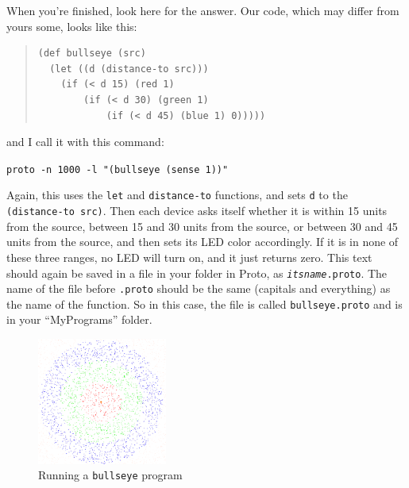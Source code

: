 \documentclass{article}
\newcommand\code[1]{\begin{center}\var{#1}\end{center}}
\newcommand\var[1]{{\tt #1}}
\begin{document}
When you're finished, look here for the answer.  Our code, which may
differ from yours some, looks like this:

\begin{quote}
\begin{verbatim}
(def bullseye (src)
  (let ((d (distance-to src)))
    (if (< d 15) (red 1)
        (if (< d 30) (green 1)
            (if (< d 45) (blue 1) 0)))))
\end{verbatim}
\end{quote}

and I call it with this command:

\code{proto -n 1000 -l "(bullseye (sense 1))"}

Again, this uses the \var{let} and \var{distance-to} functions, and
sets \var{d} to the \var{(distance-to src)}.  Then each device asks
itself whether it is within 15 units from the source, between 15 and
30 units from the source, or between 30 and 45 units from the source,
and then sets its LED color accordingly.  If it is in none of these
three ranges, no LED will turn on, and it just returns zero.  This
text should again be saved in a file in your folder in Proto, as
\var{{\em itsname}.proto}.  The name of the file before \var{.proto}
should be the same (capitals and everything) as the name of the
function.  So in this case, the file is called \var{bullseye.proto}
and is in your ``MyPrograms'' folder.

\begin{figure}
  \vspace{-0.8cm}
  \includegraphics[width=0.38\textwidth]{figures/bullseye.png}
  \caption{Running a \var{bullseye} program}
  \vspace{-0.5cm}
  \label{f:bullseye}
\end{figure}
\end{document}
